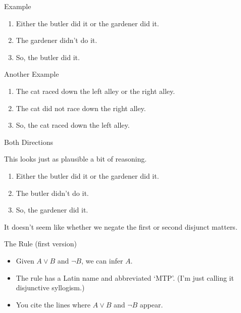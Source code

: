 \documentclass[
  ignorenonframetext,
]{beamer}
\providecommand{\tightlist}{%
  \setlength{\itemsep}{0pt}\setlength{\parskip}{0pt}}
\renewcommand{\,}{\text{, }}
\begin{document}
\begin{frame}{Example}
\protect\hypertarget{example}{}

\begin{enumerate}
\tightlist
\item
  Either the butler did it or the gardener did it.
\item
  The gardener didn't do it.
\item
  So, the butler did it.
\end{enumerate}

\end{frame}

\begin{frame}{Another Example}
\protect\hypertarget{another-example}{}

\begin{enumerate}
\tightlist
\item
  The cat raced down the left alley or the right alley.
\item
  The cat did not race down the right alley.
\item
  So, the cat raced down the left alley.
\end{enumerate}

\end{frame}

\begin{frame}{Both Directions}
\protect\hypertarget{both-directions}{}

This looks just as plausible a bit of reasoning.

\begin{enumerate}
\tightlist
\item
  Either the butler did it or the gardener did it.
\item
  The butler didn't do it.
\item
  So, the gardener did it.
\end{enumerate}

It doesn't seem like whether we negate the first or second disjunct
matters.

\end{frame}

\begin{frame}{The Rule (first version)}
\protect\hypertarget{the-rule-first-version}{}

\begin{itemize}
\tightlist
\item
  Given \(A \vee B\) and \(\neg B\), we can infer \(A\).
\item
  The rule has a Latin name and abbreviated `MTP'. (I'm just calling it
  disjunctive syllogism.)
\item
  You cite the lines where \(A \vee B\) and \(\neg B\) appear.
\end{itemize}

\end{frame}
\end{document}
